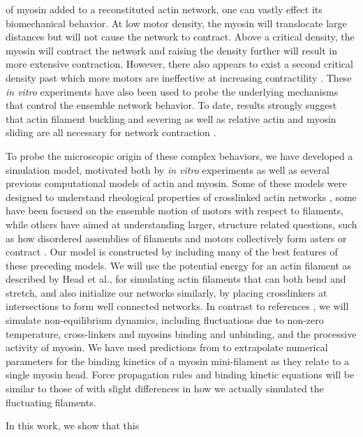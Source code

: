 \documentclass[12pt]{article} \usepackage{times} \usepackage{graphicx}
\begin{document}
of myosin added to a reconstituted actin network, one can vastly effect its
biomechanical behavior. At low motor density, the myosin will translocate large
distances but will not cause the network to contract\cite{burov2013}. Above a
critical density, the myosin will contract the network and raising the density
further will result in more extensive contraction. However, there also appears
to exist a second critical density past which more motors are ineffective at
increasing contractility \cite{murrell2014}. These \textit{in vitro}
experiments have also been used to probe the underlying mechanisms that control
the ensemble network behavior.  To date, results strongly suggest that actin
filament buckling and severing as well as relative actin and myosin sliding are
all necessary for network contraction \cite{murrell2012, murrell2014}.  \par To
probe the microscopic origin of these complex behaviors, we have developed a
simulation model, motivated both by {\em in vitro } experiments as well as
several previous computational models of actin and myosin. Some of these models
were designed to understand rheological properties of crosslinked actin
networks \cite{mackintosh1995,head2003,wilhelm2003,kim2009}, some have been
focused on the ensemble motion of motors with respect to
filaments\cite{nedelec2007,erdmann2012,stam2015}, while others have aimed at
understanding larger, structure related questions, such as how disordered
assemblies of filaments and motors collectively form asters \cite{gordon2012}
or contract \cite{wang2012,dasanyake2011,kim2014,ennomani2016}. Our model is
constructed by including many of the best features of these preceding models.
We will use the potential energy for an actin filament as described by Head et
al., for simulating actin filaments that can both bend and stretch, and also
initialize our networks similarly, by placing crosslinkers at intersections to
form well connected networks. In contrast to references \cite{head2003,
dasanyake2011}, we will simulate non-equilibrium dynamics, including
fluctuations due to non-zero temperature,  cross-linkers and myosins binding
and unbinding, and the processive activity of myosin.  We have used predictions
from \cite{stam2015} to extrapolate numerical parameters for the binding
kinetics of a myosin mini-filament as they relate to a single myosin head.
Force propagation rules and binding kinetic equations will be similar to those
of \cite{nedelec2007, gordon2012} with slight differences in how we actually
simulated the fluctuating filaments.  \par In this work, we show that this
\end{document}
